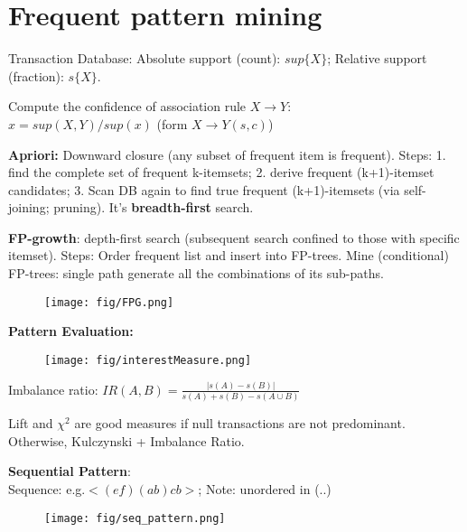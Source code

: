 \documentclass[10pt,twocolumn]{article}
\begin{document}

\section{Frequent pattern mining}
Transaction Database: 
Absolute support (count): $sup\{X\}$; Relative support (fraction): $s\{X\}$.

Compute the confidence of association rule $X\rightarrow Y$:\\ 
$x=sup(X,Y)/sup(x)$ (form $X\rightarrow Y (s,c)$)

\textbf{Apriori:} Downward closure (any subset of frequent item is frequent). Steps: 1. find the complete set of frequent k-itemsets; 2. derive frequent (k+1)-itemset candidates; 3. Scan DB again to find true frequent (k+1)-itemsets (via self-joining; pruning). It's \textbf{breadth-first} search.  

\textbf{FP-growth}: depth-first search (subsequent search confined to those with specific itemset). Steps: Order frequent list and insert into FP-trees. 
Mine (conditional) FP-trees: single path generate all the combinations of its sub-paths.

\begin{figure}[!ht]
    \centering
\texttt{[image: fig/FPG.png]}
\end{figure}

\textbf{Pattern Evaluation:} \\

\begin{figure}[!ht]
    \centering
    \texttt{[image: fig/interestMeasure.png]}
\end{figure}

Imbalance ratio: $IR(A,B)=\frac{|s(A)-s(B)|}{s(A)+s(B)-s(A\cup B)}$

Lift and $\chi^2$ are good measures if null transactions are not predominant. Otherwise, Kulczynski + Imbalance Ratio. 

\textbf{Sequential Pattern}: \\
Sequence: e.g.$<(ef)(ab)cb>$; Note: unordered in (..)
\begin{figure}[!ht]
    \centering
    \texttt{[image: fig/seq\_pattern.png]}
\end{figure}
\end{document}
